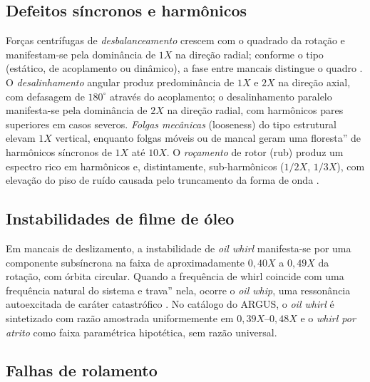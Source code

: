\subsection{Defeitos síncronos e harmônicos}

Forças centrífugas de \emph{desbalanceamento} crescem com o quadrado da
rotação e manifestam-se pela dominância de \(1X\) na direção radial; conforme o
tipo (estático, de acoplamento ou dinâmico), a fase entre mancais distingue o
quadro \cite{harris2002,randall2011}. O \emph{desalinhamento} angular produz
predominância de \(1X\) e \(2X\) na direção axial, com defasagem de \(180^\circ\)
através do acoplamento; o desalinhamento paralelo manifesta-se pela dominância
de \(2X\) na direção radial, com harmônicos pares superiores em casos severos.
\emph{Folgas mecânicas} (looseness) do tipo estrutural elevam \(1X\) vertical,
enquanto folgas móveis ou de mancal geram uma \texttt{}floresta'' de harmônicos
síncronos de \(1X\) até \(10X\). O \emph{roçamento} de rotor (rub) produz um
espectro rico em harmônicos e, distintamente, sub-harmônicos (\(1/2X\), \(1/3X\)),
com elevação do piso de ruído causada pelo truncamento da forma de onda
\cite{scheffer2004}.

\subsection{Instabilidades de filme de óleo}

Em mancais de deslizamento, a instabilidade de \emph{oil whirl} manifesta-se
por uma componente subsíncrona na faixa de aproximadamente \(0{,}40X\) a
\(0{,}49X\) da rotação, com órbita circular. Quando a frequência de whirl
coincide com uma frequência natural do sistema e \texttt{}trava'' nela, ocorre o
\emph{oil whip}, uma ressonância autoexcitada de caráter catastrófico
\cite{randall2011}. No catálogo do ARGUS, o \emph{oil whirl} é sintetizado com
razão amostrada uniformemente em \(0{,}39X\)--\(0{,}48X\) e o \emph{whirl por
atrito} como faixa paramétrica hipotética, sem razão universal.

\subsection{Falhas de rolamento}

